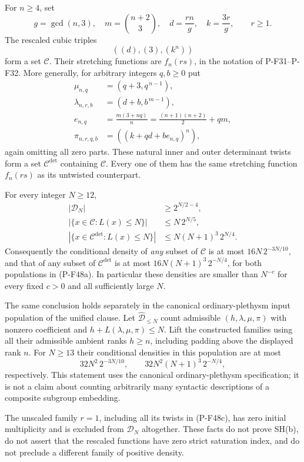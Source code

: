 \begin{proposition}
For $n\ge4$, set
\[
 g=\gcd(n,3),\quad m=\binom{n+2}{3},\quad
 d=\frac{rn}{g},\quad k=\frac{3r}{g},
 \qquad r\ge1.
\]
The rescaled cubic triples
\[
                  ((d),(3),(k^n))
 \tag{P-F48b}
\]
form a set $\mathcal C$. Their stretching functions are
$f_n(rs)$, in the notation of P-F31--P-F32.
More generally, for arbitrary integers $q,b\ge0$ put
\[
 \begin{split}
  \mu_{n,q}&=(q+3,q^{\,n-1}),\\
  \lambda_{n,r,b}&=(d+b,b^{\,m-1}),\\
  e_{n,q}&=\frac{m(3+nq)}n
          =\frac{(n+1)(n+2)}2+qm,\\
  \pi_{n,r,q,b}&=((k+qd+be_{n,q})^n),
 \end{split}
 \tag{P-F48c}
\]
again omitting all zero parts. These natural inner and outer
determinant twists form a set $\mathcal C^{\det}$ containing
$\mathcal C$. Every one of them has the same stretching
function $f_n(rs)$ as its untwisted counterpart.

For every integer $N\ge12$,
\[
 \begin{split}
 |\mathcal D_N|&\ge 2^{N/2-4},\\
 |\{x\in\mathcal C:L(x)\le N\}|
       &\le N\,2^{N/5},\\
 |\{x\in\mathcal C^{\det}:L(x)\le N\}|
       &\le N(N+1)^3\,2^{N/4}.
 \end{split}
 \tag{P-F48d}
\]
Consequently the conditional density of \emph{any} subset
of $\mathcal C$ is at most
$16N\,2^{-3N/10}$, and that of any subset of
$\mathcal C^{\det}$ is at most
$16N(N+1)^3\,2^{-N/4}$, for both populations in
(P-F48a). In particular these densities are smaller than
$N^{-c}$ for every fixed $c>0$ and all sufficiently large
$N$.

The same conclusion holds separately in the canonical
ordinary-plethysm input population of the unified clause.
Let $\widehat{\mathcal D}_{\le N}$ count admissible
$(h,\lambda,\mu,\pi)$ with nonzero coefficient and
$h+L(\lambda,\mu,\pi)\le N$. Lift the constructed
families using all their admissible ambient ranks
$h\ge n$, including padding above the displayed rank $n$.
For $N\ge13$ their conditional densities in this population
are at most
\[
 32N^2\,2^{-3N/10},\qquad
 32N^2(N+1)^3\,2^{-N/4},
 \tag{P-F48h}
\]
respectively. This statement uses the canonical
ordinary-plethysm specification; it is not a claim
about counting arbitrarily many syntactic descriptions
of a composite subgroup embedding.

The unscaled family $r=1$, including all its twists in
(P-F48c), has zero initial multiplicity and is excluded
from $\mathcal D_N$ altogether. These facts do not prove
SH(b), do not assert that the rescaled functions have zero
strict saturation index, and do not preclude a different
family of positive density.
\end{proposition}

